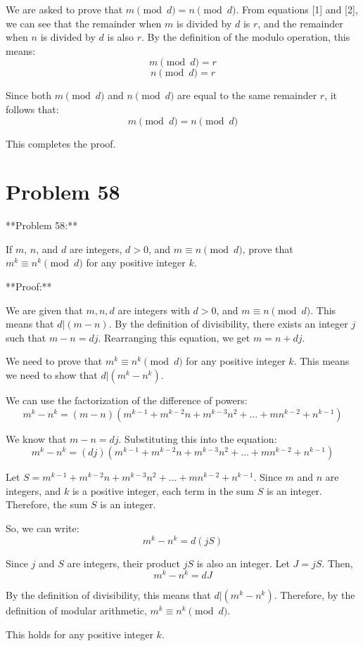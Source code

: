 \documentclass{article}
\begin{document}
We are asked to prove that $m \pmod{d} = n \pmod{d}$.
From equations [1] and [2], we can see that the remainder when $m$ is divided by $d$ is $r$, and the remainder when $n$ is divided by $d$ is also $r$.
By the definition of the modulo operation, this means:
$$m \pmod{d} = r$$
$$n \pmod{d} = r$$

Since both $m \pmod{d}$ and $n \pmod{d}$ are equal to the same remainder $r$, it follows that:
$$m \pmod{d} = n \pmod{d}$$

This completes the proof.

\newpage

\section*{Problem 58}
**Problem 58:**

If $m$, $n$, and $d$ are integers, $d > 0$, and $m \equiv n \pmod{d}$, prove that $m^k \equiv n^k \pmod{d}$ for any positive integer $k$.

**Proof:**

We are given that $m, n, d$ are integers with $d > 0$, and $m \equiv n \pmod{d}$.
This means that $d | (m - n)$.
By the definition of divisibility, there exists an integer $j$ such that $m - n = dj$.
Rearranging this equation, we get $m = n + dj$.

We need to prove that $m^k \equiv n^k \pmod{d}$ for any positive integer $k$.
This means we need to show that $d | (m^k - n^k)$.

We can use the factorization of the difference of powers:
$$m^k - n^k = (m - n)(m^{k-1} + m^{k-2}n + m^{k-3}n^2 + \dots + mn^{k-2} + n^{k-1})$$

We know that $m - n = dj$. Substituting this into the equation:
$$m^k - n^k = (dj)(m^{k-1} + m^{k-2}n + m^{k-3}n^2 + \dots + mn^{k-2} + n^{k-1})$$

Let $S = m^{k-1} + m^{k-2}n + m^{k-3}n^2 + \dots + mn^{k-2} + n^{k-1}$.
Since $m$ and $n$ are integers, and $k$ is a positive integer, each term in the sum $S$ is an integer.
Therefore, the sum $S$ is an integer.

So, we can write:
$$m^k - n^k = d(jS)$$

Since $j$ and $S$ are integers, their product $jS$ is also an integer.
Let $J = jS$. Then,
$$m^k - n^k = dJ$$

By the definition of divisibility, this means that $d | (m^k - n^k)$.
Therefore, by the definition of modular arithmetic, $m^k \equiv n^k \pmod{d}$.

This holds for any positive integer $k$.
\end{document}
